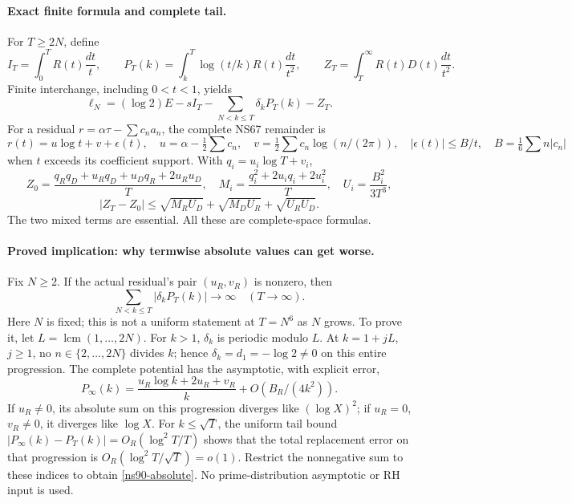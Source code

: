 \paragraph{Exact finite formula and complete tail.}
For $T\ge2N$, define
\[
 I_T=\int_0^T R(t)\frac{dt}{t},\qquad
 P_T(k)=\int_k^T\log(t/k)R(t)\frac{dt}{t^2},\qquad
 Z_T=\int_T^\infty R(t)D(t)\frac{dt}{t^2}.
\]
Finite interchange, including $0<t<1$, yields
\begin{equation}\label{ns90-finite}
 \ell_N=(\log2)E-sI_T-\sum_{N<k\le T}\delta_kP_T(k)-Z_T.
\end{equation}
For a residual $r=\alpha\tau-\sum c_na_n$, the complete NS67 remainder is
\[
 r(t)=u\log t+v+\epsilon(t),\quad
 u=\alpha-\tfrac12\sum c_n,\quad
 v=\tfrac12\sum c_n\log(n/(2\pi)),\quad
 |\epsilon(t)|\le B/t,\quad B=\tfrac16\sum n|c_n|
\]
when $t$ exceeds its coefficient support. With $q_i=u_i\log T+v_i$,
\[
 Z_0=\frac{q_Rq_D+u_Rq_D+u_Dq_R+2u_Ru_D}{T},\quad
 M_i=\frac{q_i^2+2u_iq_i+2u_i^2}{T},\quad U_i=\frac{B_i^2}{3T^3},
\]
\[
 |Z_T-Z_0|\le\sqrt{M_RU_D}+\sqrt{M_DU_R}+\sqrt{U_RU_D}.
\]
The two mixed terms are essential. All these are complete-space formulas.

\paragraph{Proved implication: why termwise absolute values can get worse.}
Fix $N\ge2$. If the actual residual's pair $(u_R,v_R)$ is nonzero, then
\begin{equation}\label{ns90-absolute}
 \sum_{N<k\le T}|\delta_kP_T(k)|\longrightarrow\infty
 \quad (T\longrightarrow\infty).
\end{equation}
Here $N$ is fixed; this is not a uniform statement at $T=N^6$ as $N$ grows.
To prove it, let $L=\operatorname{lcm}(1,\ldots,2N)$.
For $k>1$, $\delta_k$ is periodic modulo $L$.
At $k=1+jL$, $j\ge1$, no $n\in\{2,\ldots,2N\}$ divides $k$;
hence $\delta_k=d_1=-\log2\ne0$ on this entire progression.
The complete potential has the asymptotic, with explicit error,
\[
 P_\infty(k)=\frac{u_R\log k+2u_R+v_R}{k}+O(B_R/(4k^2)).
\]
If $u_R\ne0$, its absolute sum on this progression diverges like
$(\log X)^2$; if $u_R=0$, $v_R\ne0$, it diverges like $\log X$.
For $k\le\sqrt T$, the uniform tail bound
$|P_\infty(k)-P_T(k)|=O_{R}(\log^2T/T)$ shows that the total replacement
error on that progression is $O_R(\log^2T/\sqrt T)=o(1)$.
Restrict the nonnegative sum to these indices to obtain
\eqref{ns90-absolute}. No prime-distribution asymptotic or RH input is used.


